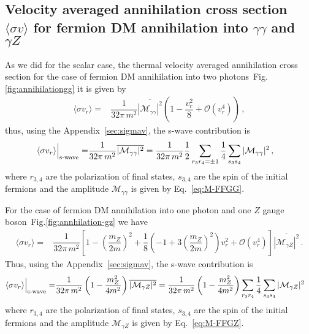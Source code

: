 \subsection{Velocity averaged annihilation cross section $\langle \sigma v \rangle$ for fermion DM annihilation into $\gamma\gamma$ and $\gamma Z$}

As we did for the scalar case, the thermal velocity averaged annihilation cross section for the case of fermion DM annihilation into two photons~Fig.\ref{fig:annihilationgg} it is given by
%
\begin{align}
\langle\sigma v_r\rangle=&\dfrac{1}{32\pi\, m^2}\overline{{|\mathcal{M}_{\gamma\gamma}|^2}}\left(1-\dfrac{v_r^2}{8}+\mathcal{O}(v_r^4)\right)\,,
\end{align}
thus, using the Appendix~\ref{sec:sigmav}, the s-wave contribution is
\begin{align}
\langle\sigma v_r\rangle\Big{\vert}_{\text{s-wave}}
=&\dfrac{1}{32\pi\, m^2}\overline{{|\mathcal{M}_{\gamma\gamma}|^2}}
=\dfrac{1}{32\pi\, m^2}\dfrac{1}{2}\sum_{r_3r_4=\pm 1}\dfrac{1}{4}\sum_{s_3s_4}{|\mathcal{M}_{\gamma\gamma}|^2} \,,
\end{align}
%
where $r_{3,4}$ are the polarization of final states, $s_{3,4}$ are the spin of the initial fermions and the amplitude $\mathcal{M}_{\gamma\gamma}$ is given by Eq.~\eqref{eq:M-FFGG}.

For the case of fermion DM annihilation into one photon and one $Z$ gauge boson~Fig.\ref{fig:annhilation-gz} we have
%
\begin{align}
\langle\sigma v_r\rangle
= &  \dfrac{1}{32\pi\, m^2}\left[ 1- \left(\dfrac{m_Z}{2m}\right)^2 +\dfrac{1}{8}\left(-1+3\left(\dfrac{m_Z}{2m}\right)^2\right) v_r^2 + \mathcal{O}(v_r^4)\right]\overline{{|\mathcal{M}_{\gamma Z}|^2}} \,.
\end{align}
%
Thus, using the Appendix~\ref{sec:sigmav}, the s-wave contribution is
\begin{align}
\langle\sigma v_r\rangle\Big{\vert}_{\text{s-wave}}
= & \dfrac{1}{32\pi\, m^2}\left( 1- \dfrac{m_Z^2}{4m^2} \right)\overline{{|\mathcal{M}_{\gamma Z}|^2}} 
=\dfrac{1}{32\pi\, m^2}\left( 1- \dfrac{m_Z^2}{4m^2} \right)\sum_{r_3r_4}\dfrac{1}{4}\sum_{s_3s_4}|\mathcal{M}_{\gamma Z}|^2
\end{align}
%
where $r_{3,4}$ are the polarization of final states, $s_{3,4}$ are the spin of the initial fermions and the amplitude $\mathcal{M}_{\gamma Z}$ is given by Eq.~\eqref{eq:M-FFGZ}.





